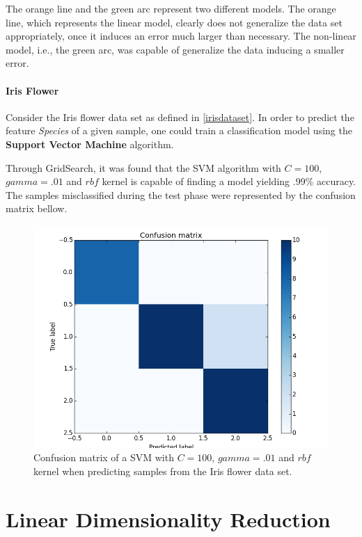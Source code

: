 \documentclass[12pt]{article}
\begin{document}
The orange line and the green arc represent two different models. The orange line, which represents the linear model, clearly does not generalize the data set appropriately, once it induces an error much larger than necessary. \cite{roh2015} The non-linear model, i.e., the green arc, was capable of generalize the data inducing a smaller error.

\paragraph{Iris Flower}

Consider the Iris flower data set as defined in \ref{irisdataset}. In order to predict the feature {\em Species} of a given sample, one could train a classification model using the \textbf{Support Vector Machine} algorithm.

Through GridSearch, it was found that the SVM algorithm with $C=100$, $gamma=.01$ and $rbf$ kernel is capable of finding a model yielding .99\% accuracy. The samples misclassified during the test phase were represented by the confusion matrix bellow.

\begin{figure}[H]
	\centering
	\captionsetup{justification=centering}

	\includegraphics[scale=.5]{svm_cm_iris}
	\caption{Confusion matrix of a SVM with $C=100$, $gamma=.01$ and $rbf$ kernel when predicting samples from the Iris flower data set.}
	\label{fig:cmsvmiris}
\end{figure}

\section{Linear Dimensionality Reduction}
\end{document}
